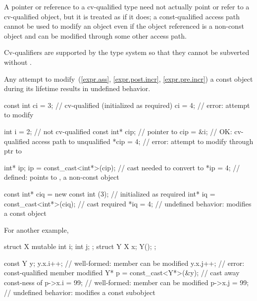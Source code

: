 \pnum
A pointer or reference to a cv-qualified type need not actually point or
refer to a cv-qualified object, but it is treated as if it does; a
const-qualified access path cannot be used to modify an object even if
the object referenced is a non-const object and can be modified through
some other access path.
\begin{note}
Cv-qualifiers are supported by the type system so that they cannot be
subverted without .
\end{note}

\pnum
{}%
Any attempt to modify~(\ref{expr.ass},
\ref{expr.post.incr}, \ref{expr.pre.incr}) a
const object during its
lifetime results in undefined behavior.
\begin{example}
\begin{codeblock}
const int ci = 3;                       // cv-qualified (initialized as required)
ci = 4;                                 // error: attempt to modify 

int i = 2;                              // not cv-qualified
const int* cip;                         // pointer to 
cip = &i;                               // OK: cv-qualified access path to unqualified
*cip = 4;                               // error: attempt to modify through ptr to 

int* ip;
ip = const_cast<int*>(cip);             // cast needed to convert  to 
*ip = 4;                                // defined:  points to , a non-const object

const int* ciq = new const int (3);     // initialized as required
int* iq = const_cast<int*>(ciq);        // cast required
*iq = 4;                                // undefined behavior: modifies a const object
\end{codeblock}
For another example,
\begin{codeblock}
struct X {
  mutable int i;
  int j;
};
struct Y {
  X x;
  Y();
};

const Y y;
y.x.i++;                                // well-formed:  member can be modified
y.x.j++;                                // error: const-qualified member modified
Y* p = const_cast<Y*>(&y);              // cast away const-ness of 
p->x.i = 99;                            // well-formed:  member can be modified
p->x.j = 99;                            // undefined behavior: modifies a const subobject
\end{codeblock}
\end{example}

